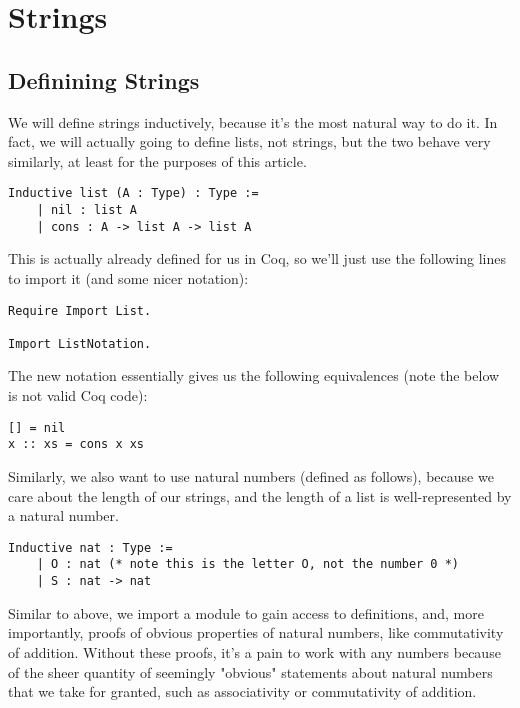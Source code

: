 \section{Strings}

\subsection{Definining Strings}

We will define strings inductively, because it's the most natural way to do it.
In fact, we will actually going to define lists, not strings, but the two behave very similarly, at least for the purposes of this article.

\begin{verbatim}
Inductive list (A : Type) : Type :=
    | nil : list A
    | cons : A -> list A -> list A
\end{verbatim}

This is actually already defined for us in Coq, so we'll just use the following lines to import it (and some nicer notation):

\begin{verbatim}
Require Import List.

Import ListNotation.
\end{verbatim}

The new notation essentially gives us the following equivalences (note the below is not valid Coq code):

\begin{verbatim}
[] = nil
x :: xs = cons x xs
\end{verbatim}

Similarly, we also want to use natural numbers (defined as follows), because we care about the length of our strings, and the length of a list is well-represented by a natural number.

\begin{verbatim}
Inductive nat : Type :=
    | O : nat (* note this is the letter O, not the number 0 *)
    | S : nat -> nat
\end{verbatim}

Similar to above, we import a module to gain access to definitions, and, more importantly, proofs of obvious properties of natural numbers, like commutativity of addition.
Without these proofs, it's a pain to work with any numbers because of the sheer quantity of seemingly "obvious" statements about natural numbers that we take for granted, such as associativity or commutativity of addition.

